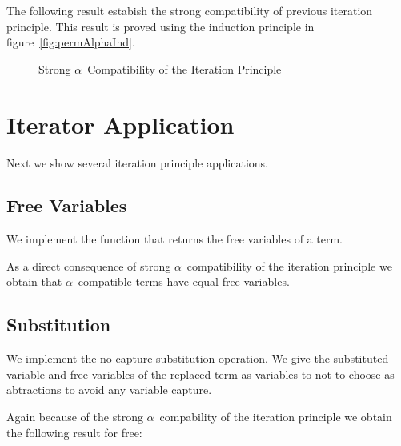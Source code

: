 \documentclass{article}
\begin{document}
 \hspace{5px}

The following result estabish the strong compatibility of previous iteration principle. This result is proved using the induction principle in figure~\ref{fig:permAlphaInd}. 

\begin{figure}[!ht]
  \caption{Strong $\alpha$\ Compatibility of the Iteration Principle}
\label{fig:strongAlphaComp}
\end{figure}


\section{Iterator Application}
\label{sec:itapp}

Next we show several iteration principle applications.

\subsection{Free Variables}
\label{sec:freevar}

We implement the function that returns the free variables of a term.

 \hspace{5px}

As a direct consequence of strong $\alpha$\ compatibility of the iteration principle we obtain that $\alpha$\ compatible terms have equal free variables. 

\subsection{Substitution}
\label{subst}

We implement the no capture substitution operation. We give the substituted variable and free variables of the replaced term as variables to not to choose as abtractions to avoid any variable capture.


 \hspace{5px}

Again because of the strong $\alpha$\ compability of the iteration principle we obtain the following result for free:

 \hspace{5px}
\end{document}
